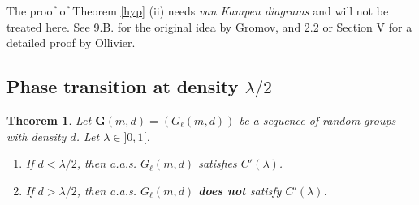 \documentclass{article}
\newcommand{\bs}{\boldsymbol}
\newtheorem{thm}{Theorem}[section]
\theoremstyle{remark}
\begin{document}
The proof of Theorem \ref{hyp} (ii) needs \textit{van Kampen diagrams} and will not be treated here. See \cite{Gro93} 9.B. for the original idea by Gromov, and \cite{Oll04} 2.2 or \cite{Oll05} Section V for a detailed proof by Ollivier.

\subsection{Phase transition at density $\lambda/2$}

\begin{thm}\label{lambda small cancellation} Let $\bs G(m,d) = (G_\ell(m,d))$ be a sequence of random groups with density $d$. Let $\lambda\in ]0,1[$.
\begin{enumerate}
    \item If $d<\lambda/2$, then a.a.s. $G_\ell(m,d)$ satisfies $C'(\lambda)$.
    \item If $d>\lambda/2$, then a.a.s. $G_\ell(m,d)$ \textbf{does not} satisfy $C'(\lambda)$.
\end{enumerate}
\end{thm}
\end{document}
